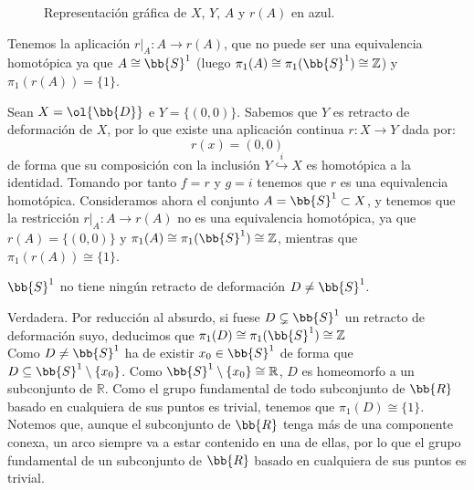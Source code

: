 \begin{ejercicio}
\begin{enumerate}[label=\alph*)]
\begin{description}
\begin{description}
\begin{figure}[h]
                        \caption{Representación gráfica de $X$, $Y$, $A$ y $r(A)$ en azul.}
                        \label{fig:conjuntoA}
                        \end{figure}
                        \noindent
                        Tenemos la aplicación $r\big|_A:A\to r(A)$, que no puede ser una equivalencia homotópica ya que $A\cong \bb{S}^1$ (luego $\pi_1(A)\cong \pi_1(\bb{S}^1)\cong \mathbb{Z}$) y $\pi_1(r(A))=\{1\}$.
                \end{description}
                
                \item[Opción B.] Sean $X = \ol{\bb{D}}$ e $Y=\{(0,0)\}$. Sabemos que $Y$ es retracto de deformación de $X$, por lo que existe una aplicación continua $r:X\to Y$ dada por:
                \begin{equation*}
                    r(x) = (0,0)
                \end{equation*}
                de forma que su composición con la inclusión $Y\stackrel{i}{\hookrightarrow} X$ es homotópica a la identidad. Tomando por tanto $f=r$ y $g=i$ tenemos que $r$ es una equivalencia homotópica. Consideramos ahora el conjunto $A = \bb{S}^1\subset X$, y tenemos que la restricción $r\big|_A:A\to r(A)$ no es una equivalencia homotópica, ya que $r(A) = \{(0,0)\}$ y $\pi_1(A)\cong \pi_1(\bb{S}^1)\cong \mathbb{Z}$, mientras que $\pi_1(r(A))\cong \{1\}$.
            \end{description}
        \item $\bb{S}^1$ no tiene ningún retracto de deformación $D\neq \bb{S}^1$.

            Verdadera. Por reducción al absurdo, si fuese $D\subsetneq \bb{S}^1$ un retracto de deformación suyo, deducimos que $\pi_1(D)\cong \pi_1(\bb{S}^1)\cong \mathbb{Z}$\\
            
            Como $D\neq \bb{S}^1$ ha de existir $x_0\in \bb{S}^1$ de forma que $D\subseteq \bb{S}^1\setminus \{x_0\}$. Como $\bb{S}^1\setminus \{x_0\}\cong \mathbb{R}$, $D$ es homeomorfo a un subconjunto de $\mathbb{R}$. Como el grupo fundamental de todo subconjunto de $\bb{R}$ basado en cualquiera de sus puntos es trivial, tenemos que $\pi_1(D)\cong \{1\}$. Notemos que, aunque el subconjunto de $\bb{R}$ tenga más de una componente conexa, un arco siempre va a estar contenido en una de ellas, por lo que el grupo fundamental de un subconjunto de $\bb{R}$ basado en cualquiera de sus puntos es trivial.\\


\end{enumerate}
\end{ejercicio}
